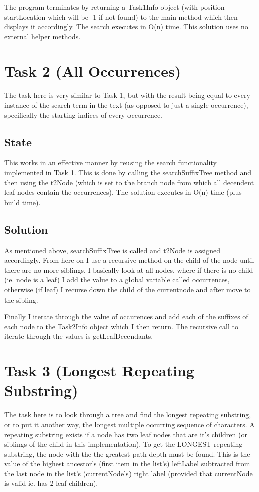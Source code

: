 \documentclass[12pt]{article} %
\begin{document}
The program terminates by returning a Task1Info object (with position startLocation which will be
-1 if not found) to the main method which then displays it accordingly. The search executes in O(n)
time. This solution uses no external helper methods.
\newpage
\section{Task 2 (All Occurrences)}
The task here is very similar to Task 1, but with the result being equal to every instance of the
search term in the text (as opposed to just a single occurrence), specifically the starting indices
of every occurrence.
\label{task2}
\subsection{State}
This works in an effective manner by reusing the search functionality implemented in Task 1. This
is done by calling the searchSuffixTree method and then using the t2Node (which is set to the
branch node from which all decendent leaf nodes contain the occurrences). The solution executes in
O(n) time (plus build time).
\subsection{Solution}
As mentioned above, searchSuffixTree is called and t2Node is assigned accordingly. From here on I
use a recursive method on the child of the node until there are no more siblings. I basically look
at all nodes, where if there is no child (ie. node is a leaf) I add the value to a global variable
called occurrences, otherwise (if leaf) I recurse down the child of the currentnode and after move
to the sibling.

Finally I iterate through the value of occurences and add each of the suffixes of each node to the
Task2Info object which I then return. The recursive call to iterate through the values is
getLeafDecendants.
\newpage
\section{Task 3 (Longest Repeating Substring)}
\label{sec:t3}
The task here is to look through a tree and find the longest repeating substring, or to put it
another way, the longest multiple occurring sequence of characters. A repeating substring exists if
a node has two leaf nodes that are it's children (or siblings of the child in this implementation).
To get the LONGEST repeating substring, the node with the the greatest path depth must be
found. This is the value of the highest ancestor's (first item in the list's) leftLabel subtracted
from the last node in the list's (currentNode's) right label (provided that currentNode is valid ie.
has 2 leaf children). 
\end{document}

